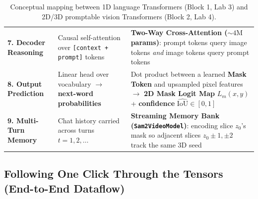 \documentclass[10.5pt,a4paper]{article}
\begin{document}
\begin{table}[!ht]
\begin{tabularx}{\textwidth}{L{3.1cm} Y Y}
\textbf{7. Decoder Reasoning} & Causal self-attention over \texttt{[context + prompt]} tokens & \textbf{Two-Way Cross-Attention ($\sim 4\text{M}$ params)}: prompt tokens query image tokens \emph{and} image tokens query prompt tokens \\
\textbf{8. Output Prediction} & Linear head over vocabulary $\to$ \textbf{next-word probabilities} & Dot product between a learned \textbf{Mask Token} and upsampled pixel features $\to$ \textbf{2D Mask Logit Map} $L_m(x,y)$ + \textbf{confidence} $\widehat{\text{IoU}} \in [0,1]$ \\
\textbf{9. Multi-Turn Memory} & Chat history carried across turns $t = 1, 2, \dots$ & \textbf{Streaming Memory Bank (\texttt{Sam2VideoModel})}: encoding slice $z_0$'s mask so adjacent slices $z_0 \pm 1, \pm 2$ track the same 3D seed \\
\bottomrule
\end{tabularx}
\caption{Conceptual mapping between 1D language Transformers (Block 1, Lab 3) and 2D/3D promptable vision Transformers (Block 2, Lab 4).}
\end{table}

\subsection{Following One Click Through the Tensors (End-to-End Dataflow)}
\end{document}
